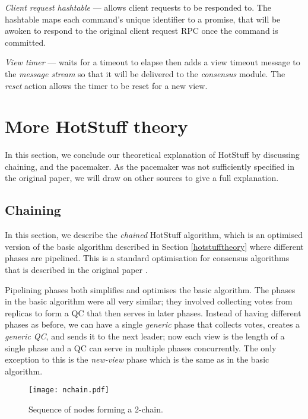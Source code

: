 \begin{description}
	\item \textit{Client request hashtable} --- allows client requests to be responded to. The hashtable maps each command's unique identifier to a promise, that will be awoken to respond to the original client request RPC once the command is committed.
	\item \textit{View timer} --- waits for a timeout to elapse then adds a view timeout message to the \textit{message stream} so that it will be delivered to the \textit{consensus} module. The \textit{reset} action allows the timer to be reset for a new view.
\end{description}

\section{More HotStuff theory} \label{moretheory}
In this section, we conclude our theoretical explanation of HotStuff by discussing chaining, and the pacemaker. As the pacemaker was not sufficiently specified in the original paper, we will draw on other sources to give a full explanation.

\subsection{Chaining} \label{chaining}

In this section, we describe the \textit{chained} HotStuff algorithm, which is an optimised version of the basic algorithm described in Section \ref{hotstufftheory} where different phases are pipelined. This is a standard optimisation for consensus algorithms that is described in the original paper \cite{yinHotStuffBFTConsensus2019}.

Pipelining phases both simplifies and optimises the basic algorithm. The phases in the basic algorithm were all very similar; they involved collecting votes from replicas to form a QC that then serves in later phases. Instead of having different phases as before, we can have a single \textit{generic} phase that collects votes, creates a \textit{generic QC}, and sends it to the next leader; now each view is the length of a single phase and a QC can serve in multiple phases concurrently. The only exception to this is the \textit{new-view} phase which is the same as in the basic algorithm.

\begin{figure}[h!]
\centering
\texttt{[image: nchain.pdf]}
\caption{Sequence of nodes forming a 2-chain.}
\label{nchain}
\end{figure}

